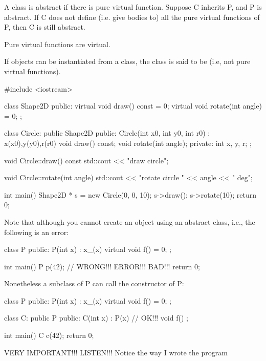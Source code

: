 A class is abstract if there is  pure virtual function.
Suppose C inherits P, and P is abstract. If C does not define (i.e. give
bodies to) all the pure virtual functions of P, then C is still
abstract.

Pure virtual functions are virtual.

If objects can be instantiated from a class, the class is said to be  (i.e, not pure virtual functions).


\begin{console}
#include <iostream>

class Shape2D
{
public:
     virtual void draw() const = 0;
     virtual void rotate(int angle) = 0;
};

class Circle: public Shape2D
{
public:
     Circle(int x0, int y0, int r0)
     : x(x0),y(y0),r(r0)
     {}
     void draw() const;
     void rotate(int angle);
private:
     int x, y, r;
};

void Circle::draw() const
{   
    std::cout << "draw circle\n";
}

void Circle::rotate(int angle)
{   
    std::cout << "rotate circle " << angle << " deg\n";
}

int main()
{   
    Shape2D * s = new Circle(0, 0, 10);
    s->draw();
    s->rotate(10);
    return 0;
}
\end{console}

Note that although you cannot create an object using an abstract class,
i.e., the following is an error:

\begin{console}
class P
{
public:
     P(int x)
     : x_(x)
     {}
     virtual void f() = 0;
};

int main()
{   
    P p(42); // WRONG!!! ERROR!!! BAD!!!
    return 0;
}
\end{console}


Nonetheless a subclass of P can call the constructor of P:
\begin{console}
class P
{
public:
     P(int x)
     : x_(x)
     {}
     virtual void f() = 0;
};

class C: public P
{
public:
     C(int x)
     : P(x) // OK!!!
     {}
     void f()
     {}
};

int main()
{   
    C c(42);
    return 0;
}
\end{console}



VERY IMPORTANT!!! LISTEN!!! Notice the way I wrote the program

